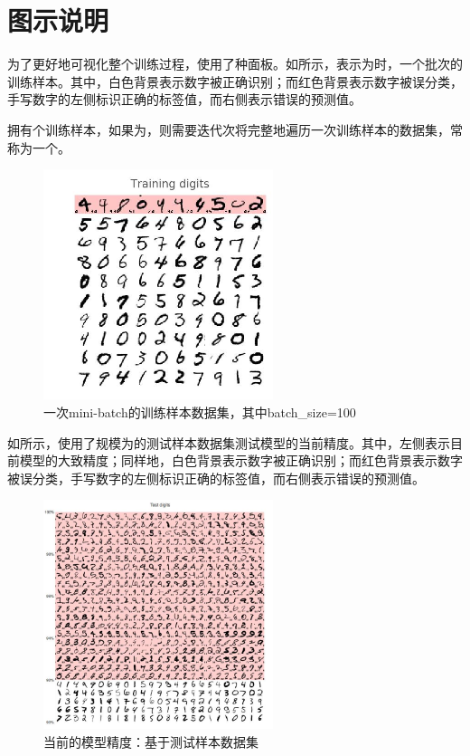 \section{图示说明}

\begin{content}

为了更好地可视化整个训练过程，使用了种面板。如所示，表示为时，一个批次的训练样本。其中，白色背景表示数字被正确识别；而红色背景表示数字被误分类，手写数字的左侧标识正确的标签值，而右侧表示错误的预测值。

拥有个训练样本，如果为，则需要迭代次将完整地遍历一次训练样本的数据集，常称为一个。

\begin{figure}[H]
\centering
\includegraphics[width=0.6\textwidth]{figures/mnist-training-digits.jpeg}
\caption{一次mini-batch的训练样本数据集，其中batch\_size=100}
 \label{fig:mnist-training-digits}
\end{figure}

如所示，使用了规模为的测试样本数据集测试模型的当前精度。其中，左侧表示目前模型的大致精度；同样地，白色背景表示数字被正确识别；而红色背景表示数字被误分类，手写数字的左侧标识正确的标签值，而右侧表示错误的预测值。

\begin{figure}[H]
\centering
\includegraphics[width=0.6\textwidth]{figures/mnist-test-digits.jpeg}
\caption{当前的模型精度：基于测试样本数据集}
 \label{fig:mnist-test-digits}
\end{figure}


\end{content}
